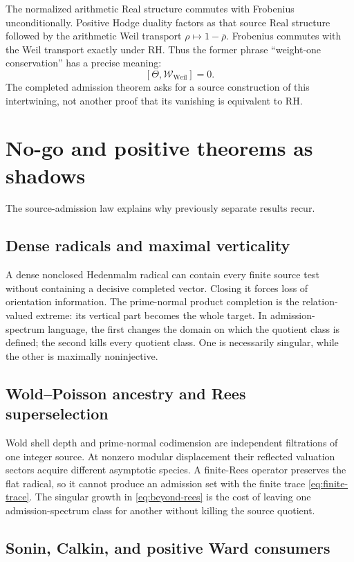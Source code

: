 \documentclass[11pt]{article}
\theoremstyle{definition}
\theoremstyle{remark}
\newcommand{\cW}{\mathcal W}
\begin{document}
The normalized arithmetic Real structure commutes with Frobenius
unconditionally.  Positive Hodge duality factors as that source Real
structure followed by the arithmetic Weil transport
\(\rho\mapsto1-\overline\rho\).  Frobenius commutes with the Weil
transport exactly under RH.  Thus the former phrase ``weight-one
conservation'' has a precise meaning:
\[
              [\Theta,\cW_{\mathrm{Weil}}]=0.
\tag{6.3}\label{eq:frobenius-hodge}
\]
The completed admission theorem asks for a source construction of this
intertwining, not another proof that its vanishing is equivalent to RH.

\section{No-go and positive theorems as shadows}
\label{sec:shadows}

The source-admission law explains why previously separate results recur.

\subsection{Dense radicals and maximal verticality}

A dense nonclosed Hedenmalm radical can contain every finite source test
without containing a decisive completed vector.  Closing it forces loss of
orientation information.  The prime-normal product completion is the
relation-valued extreme: its vertical part becomes the whole target.
In admission-spectrum language, the first changes the domain on which the
quotient class is defined; the second kills every quotient class.  One is
necessarily singular, while the other is maximally noninjective.

\subsection{Wold--Poisson ancestry and Rees superselection}

Wold shell depth and prime-normal codimension are independent filtrations
of one integer source.  At nonzero modular displacement their reflected
valuation sectors acquire different asymptotic species.  A finite-Rees
operator preserves the flat radical, so it cannot produce an admission
set with the finite trace \eqref{eq:finite-trace}.  The singular growth in
\eqref{eq:beyond-rees} is the cost of leaving one admission-spectrum
class for another without killing the source quotient.

\subsection{Sonin, Calkin, and positive Ward consumers}
\end{document}
